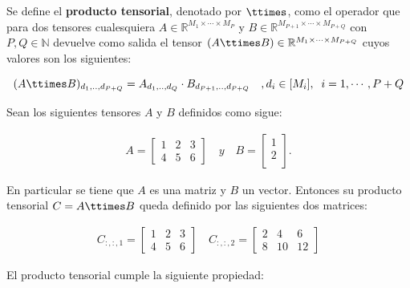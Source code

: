 \begin{definicion}
Se define el \textbf{producto tensorial}, denotado por $\ttimes$, como el operador que para dos tensores cualesquiera $A\in\mathbb{R}^{M_1\times\cdots \times M_P}$ y $B\in\mathbb{R}^{M_{P+1}\times\cdots \times M_{P+Q}}$ con $P,Q\in\mathbb{N}$ devuelve como salida el tensor $(A\ttimes B) \in\mathbb{R}^{M_1\times\cdots \times M_{P+Q}}$ cuyos valores son los siguientes:

\begin{equation}
(A\ttimes B)_{d_1,..,d_{P+Q}} = A_{d_1,..,d_Q} \cdot B_{d_{P+1},..,d_{P+Q}}\quad, d_i\in[M_i], \;\; i=1,\cdots ,P+Q
\end{equation}
\end{definicion}

\begin{ejemplo}
Sean los siguientes tensores $A$ y $B$ definidos como sigue:

\begin{align*}
A = \begin{bmatrix}
1 & 2 & 3 \\
4 & 5 & 6
\end{bmatrix} \quad y \quad 
B = \begin{bmatrix}
1 \\
2 \\
\end{bmatrix}.
\end{align*}

En particular se tiene que $A$ es una matriz y $B$ un vector. Entonces su producto tensorial $C = A \ttimes B$ queda definido por las siguientes dos matrices:

\begin{align*}
C_{:,:,1} = \begin{bmatrix}
1 & 2 & 3 \\
4 & 5 & 6 
\end{bmatrix} \quad
C_{:,:,2} = \begin{bmatrix}
2 & 4 & 6 \\
8 & 10 & 12 
\end{bmatrix}
\end{align*}

\end{ejemplo}

El producto tensorial cumple la siguiente propiedad:

